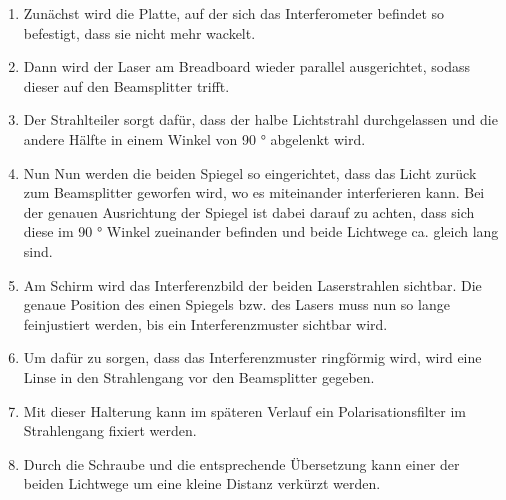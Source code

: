\documentclass[12pt,english,ngerman]{scrartcl}
\begin{document}
\begin{enumerate}
	\item Zunächst wird die Platte, auf der sich das Interferometer befindet so
	      befestigt, dass sie nicht mehr wackelt.
	\item Dann wird der Laser am Breadboard wieder parallel ausgerichtet, sodass dieser
	      auf den Beamsplitter trifft.
	\item Der Strahlteiler sorgt dafür, dass der halbe Lichtstrahl durchgelassen und die
	      andere Hälfte in einem Winkel von 90 ° abgelenkt wird.
	\item Nun Nun werden die beiden Spiegel so eingerichtet, dass das Licht zurück zum
	      Beamsplitter geworfen wird, wo es miteinander interferieren kann. Bei der
	      genauen Ausrichtung der Spiegel ist dabei darauf zu achten, dass sich diese im
	      90 ° Winkel zueinander befinden und beide Lichtwege ca. gleich lang sind.
	\item Am Schirm wird das Interferenzbild der beiden Laserstrahlen sichtbar. Die
	      genaue Position des einen Spiegels bzw. des Lasers muss nun so lange
	      feinjustiert werden, bis ein Interferenzmuster sichtbar wird.
	\item Um dafür zu sorgen, dass das Interferenzmuster ringförmig wird, wird eine Linse
	      in den Strahlengang vor den Beamsplitter gegeben.
	\item Mit dieser Halterung kann im späteren Verlauf ein Polarisationsfilter im
	      Strahlengang fixiert werden.
	\item Durch die Schraube und die entsprechende Übersetzung kann einer der beiden
	      Lichtwege um eine kleine Distanz verkürzt werden.
\end{enumerate}
\end{document}

